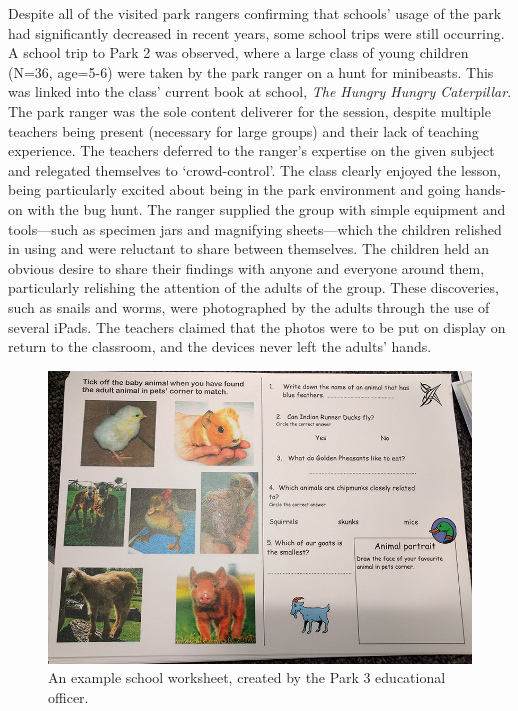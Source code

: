 Despite all of the visited park rangers confirming that schools’ usage of the park had significantly decreased in recent years, some school trips were still occurring. A school trip to Park 2 was observed, where a large class of young children (N=36, age=5-6) were taken by the park ranger on a hunt for minibeasts. This was linked into the class' current book at school, \textit{The Hungry Hungry Caterpillar}. The park ranger was the sole content deliverer for the session, despite multiple teachers being present (necessary for large groups) and their lack of teaching experience. The teachers deferred to the ranger's expertise on the given subject and relegated themselves to `crowd-control'. The class clearly enjoyed the lesson, being particularly excited about being in the park environment and going hands-on with the bug hunt. The ranger supplied the group with simple equipment and tools---such as specimen jars and magnifying sheets---which the children relished in using and were reluctant to share between themselves. The children held an obvious desire to share their findings with anyone and everyone around them, particularly relishing the attention of the adults of the group. These discoveries, such as snails and worms, were photographed by the adults through the use of several iPads. The teachers claimed that the photos were to be put on display on return to the classroom, and the devices never left the adults' hands.

\begin{figure}
  \centering
  \includegraphics[width=0.8\columnwidth]{images/chapter04/worksheet.jpg}
  \caption[An existing park worksheet]{An example school worksheet, created by the Park 3 educational officer.}
  \label{fig:worksheet}
\end{figure}

